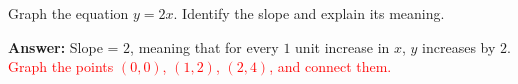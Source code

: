 \documentclass[12pt]{article}
\begin{document}
\begin{tcolorbox}[colframe=black!50, colback=white, title=\textbf{Problem 10 (8.EE.B.5)}]
Graph the equation \(y = 2x\). Identify the slope and explain its meaning.

\textbf{Answer:} Slope = \(2\), meaning that for every \(1\) unit increase in \(x\), \(y\) increases by \(2\).  
\textcolor{red}{Graph the points \((0, 0)\), \((1, 2)\), \((2, 4)\), and connect them.}
\end{tcolorbox}
\end{document}
